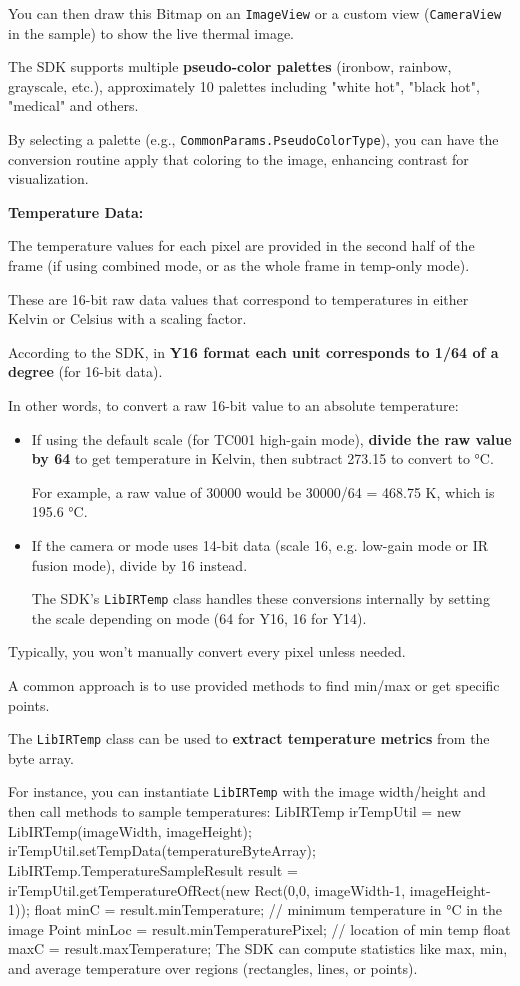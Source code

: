 {You can then draw this Bitmap on an \texttt{ImageView} or a custom view (\texttt{CameraView} in the sample) to show the live thermal image.

The SDK supports multiple \textbf{pseudo-color palettes}
 (ironbow, rainbow, grayscale, etc.), approximately 10 palettes including "white hot", "black hot", "medical" and others.

By selecting a palette (e.g., \texttt{CommonParams.PseudoColorType}), you can have the conversion routine apply that coloring to the image, enhancing contrast for visualization.

\textbf{Temperature Data:}

The temperature values for each pixel are provided in the second half of the frame (if using combined mode, or as the whole frame in temp-only mode).

These are 16-bit raw data values that correspond to temperatures in either Kelvin or Celsius with a scaling factor.

According to the SDK, in \textbf{Y16 format each unit corresponds to 1/64 of a degree}
 (for 16-bit data).

In other words, to convert a raw 16-bit value to an absolute temperature: \begin{itemize}
 
\item If using the default scale (for TC001 high-gain mode), \textbf{divide the raw value by 64}
 to get temperature in Kelvin, then subtract 273.15 to convert to °C.

For example, a raw value of 30000 would be 30000/64 = 468.75 K, which is 195.6 °C.

\item If the camera or mode uses 14-bit data (scale 16, e.g. low-gain mode or IR fusion mode), divide by 16 instead.

The SDK's \texttt{LibIRTemp} class handles these conversions internally by setting the scale depending on mode (64 for Y16, 16 for Y14).

\end{itemize}

Typically, you won't manually convert every pixel unless needed.

A common approach is to use provided methods to find min/max or get specific points.

The \texttt{LibIRTemp} class can be used to \textbf{extract temperature metrics}
 from the byte array.

For instance, you can instantiate \texttt{LibIRTemp} with the image width/height and then call methods to sample temperatures: LibIRTemp irTempUtil = new LibIRTemp(imageWidth, imageHeight); irTempUtil.setTempData(temperatureByteArray); LibIRTemp.TemperatureSampleResult result = irTempUtil.getTemperatureOfRect(new Rect(0,0, imageWidth-1, imageHeight-1)); float minC = result.minTemperature; // minimum temperature in °C in the image Point minLoc = result.minTemperaturePixel; // location of min temp float maxC = result.maxTemperature; The SDK can compute statistics like max, min, and average temperature over regions (rectangles, lines, or points).

}
